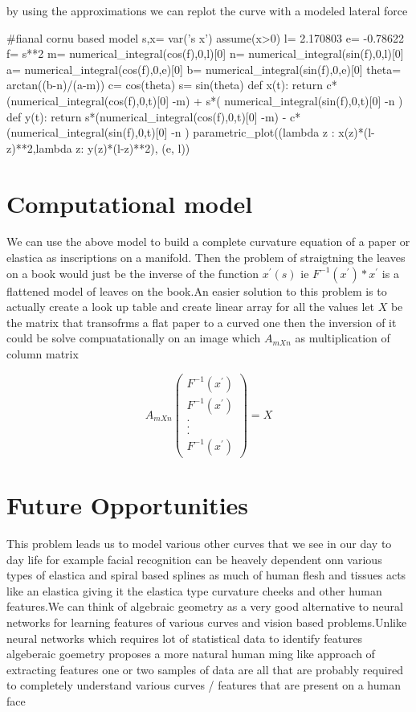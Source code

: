\documentclass[longbibliography]{revtex4-1}
\begin{document}
 by using the approximations we can replot the curve with a modeled lateral force

\begin{sageblock}
#fianal cornu based model
s,x= var('s x')
assume(x>0)
l= 2.170803
e= -0.78622
f= s**2
m= numerical_integral(cos(f),0,l)[0]
n= numerical_integral(sin(f),0,l)[0]
a= numerical_integral(cos(f),0,e)[0]
b= numerical_integral(sin(f),0,e)[0]
theta= arctan((b-n)/(a-m))
c= cos(theta)
s= sin(theta)
def x(t): return c*(numerical_integral(cos(f),0,t)[0] -m) + s*( numerical_integral(sin(f),0,t)[0] -n )
def y(t): return s*(numerical_integral(cos(f),0,t)[0] -m) - c*(numerical_integral(sin(f),0,t)[0] -n )
parametric_plot((lambda z : x(z)*(l-z)**2,lambda z: y(z)*(l-z)**2), (e, l))
\end{sageblock}


\section{Computational model}
We can use the above model to build a complete curvature equation of a paper or elastica as inscriptions on a manifold.
Then the problem of straigtning the leaves on a book would just be the inverse of the function $x^{'}(s)$
ie $F^{-1}(x^{'})*x^{'}$ is a flattened model of leaves on the book.An easier solution to this problem is to actually create a look up table and create linear array for all the values let $X$ be the matrix that transofrms a flat paper to  a curved one then the inversion of it could be solve compuatationally on an image which $A_{mXn}$ as multiplication of column matrix

\[A_{mXn} \left( \begin{array}{ccc}
F^{-1}(x^{'}) \\
F^{-1}(x^{'}) \\
.\\
.\\
.\\
F^{-1}(x^{'}) \end{array} \right) = X\] 

\section{Future Opportunities}
This problem leads us to model various other curves that we see in our day to day life for example facial recognition can be heavely dependent onn various types of elastica and spiral based splines as much of human flesh and tissues acts like an elastica  giving it the elastica type curvature cheeks and other human features.We can think of algebraic geometry as a very good alternative to neural networks for learning features of various curves and vision based problems.Unlike neural networks which requires lot of statistical data to identify  features algeberaic goemetry proposes a more natural human ming like approach of extracting features one or two samples of data are all that are probably required to completely understand various curves / features that are present on a human face


\end{document}
